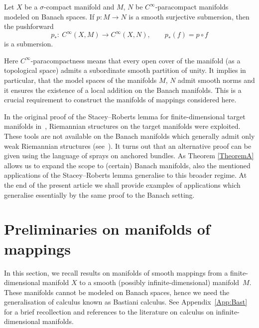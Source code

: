 \begin{theoremA} \label{TheoremA}
Let $X$ be a $\sigma$-compact manifold and $M$, $N$ be $C^\infty$-paracompact manifolds modeled on Banach spaces.
If $p \colon M \rightarrow N$ is a smooth surjective submersion, then the pushforward
\begin{displaymath} p_\ast \colon\ C^\infty (X,M) \rightarrow C^\infty (X,N),\qquad p_\ast (f)=p\circ f\end{displaymath}
 is a submersion.
\end{theoremA}

Here $C^\infty$-paracompactness means that every open cover of the manifold (as a topological space) admits a subordinate smooth partition of unity. It implies in particular, that the model spaces of the manifolds $M$, $N$ admit smooth norms and it ensures the existence of a local addition on the Banach manifolds. This is a crucial requirement to construct the manifolds of mappings considered here.

In the original proof of the Stacey--Roberts lemma for finite-dimensional target manifolds in~\cite{AaS19}, Riemannian structures on the target manifolds were exploited. These tools are not available on the Banach manifolds which generally admit only weak Riemannian structures (see~\cite{Sch23}). It turns out that an alternative proof can be given using the language of sprays on anchored bundles. As Theorem \ref{TheoremA} allows us to expand the scope to (certain) Banach manifolds, also the mentioned applications of the Stacey--Roberts lemma generalise to this broader regime. At the end of the present article we shall provide examples of applications which generalise essentially by the same proof to the Banach setting.

\section{Preliminaries on manifolds of mappings}
In this section, we recall results on manifolds of smooth mappings from a finite-dimensional manifold $X$ to a smooth (possibly infinite-dimensional) manifold~$M$. These manifolds cannot be modeled on Banach spaces, hence we need the generalisation of calculus known as Bastiani calculus. See Appendix~\ref{App:Bast}
for a brief recollection and references to the literature on calculus on infinite-dimensional manifolds.

